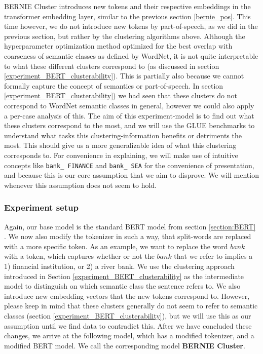 \documentclass[a4paper,12pt,twoside,openright]{report}
\begin{document}
BERNIE Cluster introduces new tokens and their respective embeddings in the transformer embedding layer, similar to the previous section \ref{bernie_pos}.
This time however, we do not introduce new tokens by part-of-speech, as we did in the previous section, but rather by the clustering algorithms above.
Although the hyperparameter optimization method optimized for the best overlap with coarseness of semantic classes as defined by WordNet, it is not quite interpretable to what these different clusters correspond to (as discussed in section  \ref{experiment_BERT_clusterability}).
This is partially also because we cannot formally capture the concept of semantics or part-of-speech.
In section \ref{experiment_BERT_clusterability}) we had seen that these clusters do not correspond to WordNet semantic classes in general, however we could also apply a per-case analysis of this.
The aim of this experiment-model is to find out what these clusters correspond to the most, and we will use the GLUE benchmarks to understand what tasks this clustering-information benefits or detriments the most.
This should give us a more generalizable idea of what this clustering corresponds to.
For convenience in explaining, we will make use of intuitive concepts like \texttt{bank\_ FINANCE} and \texttt{bank\_ SEA} for the convenience of presentation, and because this is our core assumption that we aim to disprove.
We will mention whenever this assumption does not seem to hold.

\subsubsection{Experiment setup}

Again, our base model is the standard BERT model from section \ref{section:BERT} .
We now also modify the tokenizer in such a way, that split-words are replaced with a more specific token.
As an example, we want to replace the word $bank$ with a token, which captures whether or not the $bank$ that we refer to implies a 1) financial institution, or 2) a river bank.
We use the clustering approach introduced in Section \ref{experiment_BERT_clusterability} as the intermediate model to distinguish on which semantic class the sentence refers to.
We also introduce new embedding vectors that the new tokens correspond to.
However, please keep in mind that these clusters generally do not seem to refer to semantic classes (section \ref{experiment_BERT_clusterability}), but we will use this as our assumption until we find data to contradict this.
After we have concluded these changes, we arrive at the following model, which has a modified tokenizer, and a modified BERT model.
We call the corresponding model \textbf{BERNIE Cluster}.
\end{document}
